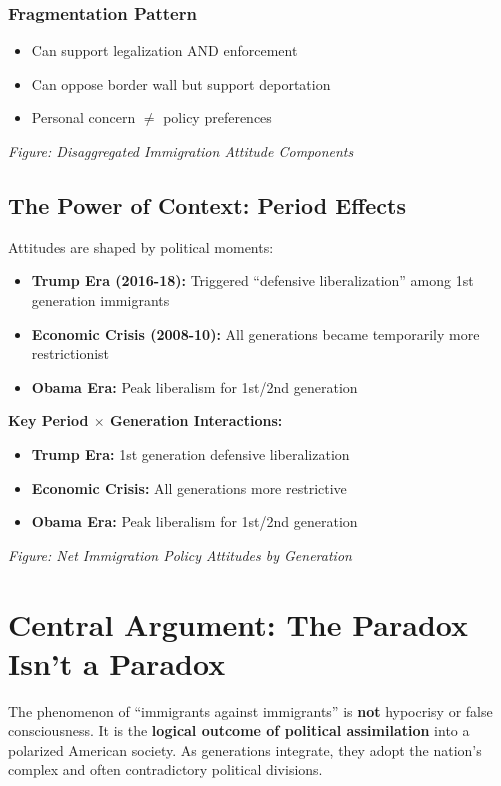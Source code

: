 \documentclass[11pt,letterpaper]{article}
\begin{document}
\subsubsection{Fragmentation Pattern}
\begin{itemize}
    \item Can support legalization AND enforcement
    \item Can oppose border wall but support deportation
    \item Personal concern $\neq$ policy preferences
\end{itemize}

\textit{Figure: Disaggregated Immigration Attitude Components}

\subsection{The Power of Context: Period Effects}

Attitudes are shaped by political moments:

\begin{itemize}
    \item \textbf{Trump Era (2016-18):} Triggered ``defensive liberalization'' among 1st generation immigrants
    \item \textbf{Economic Crisis (2008-10):} All generations became temporarily more restrictionist
    \item \textbf{Obama Era:} Peak liberalism for 1st/2nd generation
\end{itemize}

\textbf{Key Period $\times$ Generation Interactions:}
\begin{itemize}
    \item \textbf{Trump Era:} 1st generation defensive liberalization
    \item \textbf{Economic Crisis:} All generations more restrictive
    \item \textbf{Obama Era:} Peak liberalism for 1st/2nd generation
\end{itemize}

\textit{Figure: Net Immigration Policy Attitudes by Generation}

\section{Central Argument: The Paradox Isn't a Paradox}

The phenomenon of ``immigrants against immigrants'' is \textbf{not} hypocrisy or false consciousness. It is the \textbf{logical outcome of political assimilation} into a polarized American society. As generations integrate, they adopt the nation's complex and often contradictory political divisions.
\end{document}
